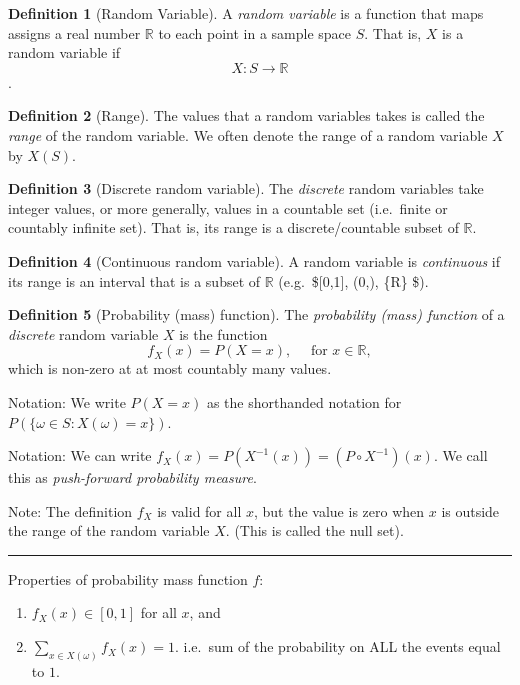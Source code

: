 \documentclass[
]{book}
\theoremstyle{definition}
\newtheorem{definition}{Definition}[chapter]
\theoremstyle{definition}
\theoremstyle{definition}
\theoremstyle{definition}
\theoremstyle{remark}
\begin{document}
\begin{definition}[Random Variable]
A \emph{random variable} is a function that maps assigns a real number \(\mathbb{R}\) to each point in a sample space \(S\). That is, \(X\) is a random variable if
\[X:S\to \mathbb{R}\].
\end{definition}

\begin{definition}[Range]
The values that a random variables takes is called the \emph{range} of the random variable. We often denote the range of a random variable \(X\) by \(X(S)\).
\end{definition}

\begin{definition}[Discrete random variable]
The \emph{discrete} random variables take integer values, or more generally, values in a countable set (i.e.~finite or countably infinite set). That is, its range is a discrete/countable subset of \(\mathbb{R}\).
\end{definition}

\begin{definition}[Continuous random variable]
A random variable is \emph{continuous} if its range is an interval that is a subset of \({\mathbb R}\) (e.g.~\${[}0,1{]}, (0,\infty), \{\mathbb R\} \$).
\end{definition}

\begin{definition}[Probability (mass) function]
The \emph{probability (mass) function} of a \emph{discrete} random variable \(X\) is the function
\[
f_X(x) = P(X=x),\quad \text{ for } x\in \mathbb{R},
\]
which is non-zero at at most countably many values.
\end{definition}

Notation: We write \(P(X=x)\) as the shorthanded notation for \(P(\{\omega \in S : X(\omega)=x\})\).

Notation: We can write \(f_X(x)=P(X^{-1}(x))=(P\circ X^{-1})(x)\). We call this as \emph{push-forward probability measure}.

Note: The definition \(f_X\) is valid for all \(x\), but the value is zero when \(x\) is outside the range of the random variable \(X\). (This is called the null set).

\begin{center}\rule{0.5\linewidth}{0.5pt}\end{center}

Properties of probability mass function \(f\):

\begin{enumerate}
\def\labelenumi{\arabic{enumi}.}
\item
  \(f_X(x)\in[0,1]\) for all \(x\), and
\item
  \(\sum_{x\in X(\omega)}f_X(x) =1\). i.e.~sum of the probability on ALL the events equal to \(1\).
\end{enumerate}
\end{document}
